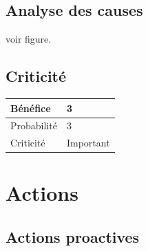 \subsection*{Analyse des causes}
	voir figure.

\subsection*{Criticité}

\begin{table}[h]
\centering
	\begin{tabularx}{12.8cm}{|>{
	}X|X|}
	\hline
	Bénéfice & 3\\
	\hline
	Probabilité & 3\\
	\hline
	Criticité & Important\\
	\hline
	\end{tabularx}
\end{table}
\newpage

\section*{Actions}
\subsection*{Actions proactives}

